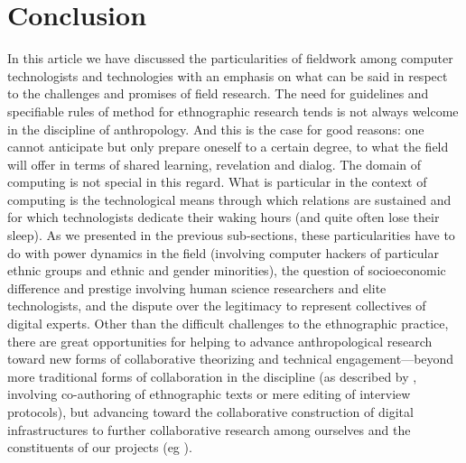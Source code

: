 \documentclass[10pt,letter,oneside]{scrartcl}
\begin{document}


\section*{Conclusion}

In this article we have discussed the particularities of fieldwork
among computer technologists and technologies with an emphasis on what
can be said in respect to the challenges and promises of field
research. The need for guidelines and specifiable rules of method for
ethnographic research tends is not always welcome in the discipline of
anthropology.   And this is the case for good reasons: one cannot
anticipate but only prepare oneself to a certain degree, to what the
field will offer in terms of shared learning, revelation and
dialog. The domain of computing is not special in this regard. What is
particular in the context of computing is the technological means
through which relations are sustained and for which technologists
dedicate their waking hours (and quite often lose their sleep). As we
presented in the previous sub-sections, these particularities have to
do with power dynamics in the field (involving computer hackers of
particular ethnic groups and ethnic and gender minorities), the
question of socioeconomic difference and prestige involving human
science researchers and elite technologists, and the dispute over the
legitimacy to represent collectives of digital experts. Other than the difficult
challenges to the ethnographic practice, there are great opportunities
for helping to advance anthropological research toward new forms of
collaborative theorizing and technical engagement---beyond more
traditional forms of collaboration in the discipline (as described by
\cite{Lassiter200x}, involving co-authoring of ethnographic texts or mere
editing of interview protocols), but advancing toward the
collaborative construction of digital infrastructures to further
collaborative research among ourselves and the constituents of our
projects (eg \cite{FortunandFortun2015}).

%
%

\printbibliography
\end{document}
